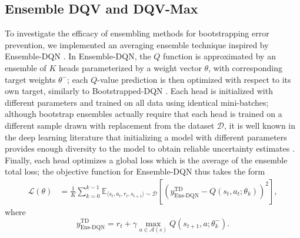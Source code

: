 \subsection{Ensemble DQV and DQV-Max}
To investigate the efficacy of ensembling methods for
bootstrapping error prevention, we implemented an averaging ensemble
technique inspired by Ensemble-DQN \citep{agarwal2020optimistic}.
In Ensemble-DQN, the $Q$ function is approximated by
an ensemble of $K$ heads parameterized by a weight vector $\theta$,
with corresponding target weights $\theta^-$; each $Q$-value
prediction
is then optimized with respect to its own target,
similarly to Bootstrapped-DQN \citep{osband2016deep}. Each head is
initialized with different parameters and trained on all data using
identical mini-batches; although bootstrap ensembles actually require
that each head is trained on a different sample drawn with
replacement from the dataset $\mathcal{D}$, it is well known in the
deep learning literature that
initializing a model with different parameters provides enough
diversity to the model to obtain reliable uncertainty estimates
\citep{osband2016deep,levine2020offline}. Finally, each head optimizes
a global loss which is the average of the ensemble total loss; the
objective function for Ensemble-DQN thus takes the form
\begin{align}
\mathcal{L}\left(\theta\right)&=\frac{1}{K}\sum_{k=0}^{k-1}\mathbb{E}_{\langle
                     s_t,a_t,r_t,s_{t+1}\rangle\sim\mathcal{D}}\left[{\left(y^{\scriptscriptstyle\textrm{TD}}_{\scriptscriptstyle\textrm{Ens-DQN}}-Q\left(s_t,a_t;\theta_{k}\right)\right)}^2\right],
\end{align}
where
\begin{equation}
  y^{\scriptscriptstyle\textrm{TD}}_{\scriptscriptstyle\textrm{Ens-DQN}}=r_t+\gamma\max_{a\in\mathcal{A}\left(s\right)}Q\left(s_{t+1},a;\theta_{k}^{-}\right).
\end{equation}

